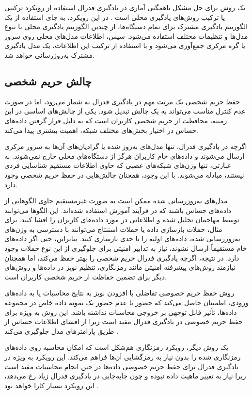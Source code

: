 یک روش برای حل مشکل ناهمگنی آماری در یادگیری فدرال استفاده از رویکرد ترکیبی یا ترکیب روش‌های یادگیری محلی است
\cite{konevcny2015federated}.
در این رویکرد، به جای استفاده از یک الگوریتم یادگیری مشترک برای تمام دستگاه‌ها، از چندین الگوریتم یادگیری محلی با تنوع مدل‌ها و تنظیمات مختلف استفاده می‌شود. سپس، اطلاعات مدل‌های محلی روی سرور یا گره مرکزی جمع‌آوری می‌شود و با استفاده از ترکیب این اطلاعات، یک مدل یادگیری مشترک به‌روزرسانی خواهد شد.



\subsection{چالش حریم شخصی}\label{privacy_challenge}
حفظ حریم شخصی یک مزیت مهم در یادگیری فدرال به شمار می‌رود، اما در صورت عدم کنترل مناسب می‌تواند به یک چالش تبدیل شود. یکی از چالش‌های اساسی در این زمینه، محافظت از حریم شخصی کاربران است که به دلیل قرار گرفتن داده‌های حساس در اختیار بخش‌های مختلف شبکه، اهمیت بیشتری پیدا می‌کند.

اگرچه در یادگیری فدرال، تنها مدل‌های به‌روز شده یا گرادیان‌های آن‌ها به سرور مرکزی ارسال می‌شوند و داده‌های خام کاربران هرگز از دستگاه‌های محلی خارج نمی‌شوند. به عبارتی، تنها وزن‌های شبکه‌های عصبی که حاوی اطلاعات مستقیم شناسایی فردی نیستند، مبادله می‌شوند. با این وجود، همچنان چالش‌هایی در حفظ حریم شخصی وجود دارد. 

مدل‌های به‌روزرسانی‌ شده ممکن است به صورت غیرمستقیم حاوی الگوهایی از داده‌های حساس باشند که در فرآیند آموزش استفاده شده‌اند. این الگوها می‌توانند توسط مهاجمان تحلیل شده و اطلاعاتی در مورد داده‌های کاربران را افشا کنند. برای مثال، حملات بازسازی داده یا حملات استنتاج می‌توانند با دسترسی به وزن‌های به‌روزرسانی شده، داده‌های اولیه را تا حدی بازسازی کنند. بنابراین، حتی اگر داده‌های خام مستقیماً ارسال نشوند، نیاز به تدابیر امنیتی برای جلوگیری از این نوع حملات وجود دارد. در نتیجه، اگرچه یادگیری فدرال حریم شخصی را بهتر حفظ می‌کند، اما همچنان نیازمند روش‌های پیشرفته امنیتی مانند رمزنگاری، تنظیم نویز در داده‌ها و روش‌های دیگر برای تضمین حفاظت از حریم شخصی کاربران است.


روش حفظ حریم خصوصی تفاضلی%
با افزودن نویز به نتایج محاسبات یا به داده‌های ورودی، اطمینان حاصل می‌کند که حضور یا عدم حضور یک نمونه داده خاص در مجموعه داده‌ها، تأثیر قابل توجهی بر خروجی محاسبات نداشته باشد. این روش به ویژه برای حفظ حریم خصوصی در یادگیری فدرال مفید است زیرا از افشای اطلاعات حساس از طریق پارامترهای مدل جلوگیری می‌کند
\cite{hasan2023security}.

یک روش دیگر، رویکرد رمزنگاری هم‌شکل%
است که امکان محاسبه روی داده‌های رمزنگاری شده را بدون نیاز به رمزگشایی آن‌ها فراهم می‌کند. این رویکرد به ویژه در یادگیری فدرال برای حفظ حریم خصوصی داده‌ها در حین انجام محاسبات مفید است زیرا نیاز به تغییر ماهیت داده نبوده و چون جابه‌جایی در یادگیری فدرال زیاد رخ می‌دهد، این رویکرد بسیار کارا خواهد بود
\cite{yin2021comprehensive}.



